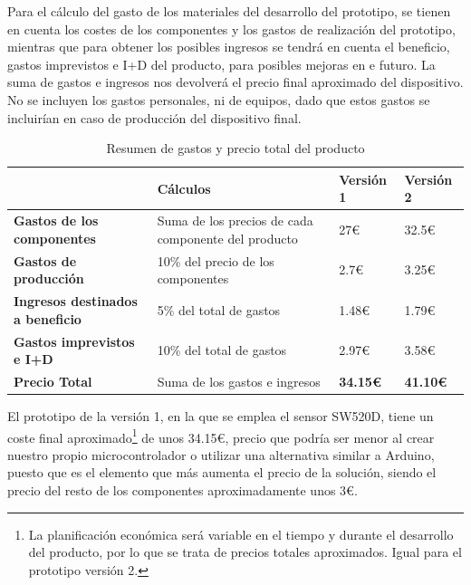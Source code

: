 Para el cálculo del gasto de los materiales del desarrollo del prototipo, se tienen en cuenta los costes de los componentes y los gastos de realización del prototipo, mientras que para obtener los posibles ingresos se tendrá en cuenta el beneficio, gastos imprevistos e I+D del producto, para posibles mejoras en e futuro. La suma de gastos e ingresos nos devolverá el precio final aproximado del dispositivo. No se incluyen los gastos personales, ni de equipos, dado que estos gastos se incluirían en caso de producción del dispositivo final.


\begin{table}[h!]
\centering
\begin{tabular}{ |m{4cm}|m{4cm}|m{2cm}|m{2cm}|  } 
\hline
\cellcolor[HTML]{B9E3F0}\textbf{} & \cellcolor[HTML]{B9E3F0}\textbf{Cálculos} & \cellcolor[HTML]{B9E3F0}\textbf{Versión 1}& \cellcolor[HTML]{B9E3F0}\textbf{Versión 2}\\

\hline
\cellcolor[HTML]{EFEFEF}\textbf{Gastos de los componentes}             & {Suma de los precios de cada componente del producto}   & 27€ & 32.5€\\
\hline
\cellcolor[HTML]{EFEFEF}\textbf{Gastos de producción}                & {10\% del precio de los componentes} & 2.7€ & 3.25€\\
\hline
\cellcolor[HTML]{EFEFEF}\textbf{Ingresos destinados a beneficio}                & {5\% del total de gastos} & 1.48€ & 1.79€\\
\hline
\cellcolor[HTML]{EFEFEF}\textbf{Gastos imprevistos e I+D} & {10\% del total de gastos} & 2.97€ & 3.58€\\
\hline
\cellcolor[HTML]{EFEFEF}\textbf{Precio Total} & {Suma de los gastos e ingresos} & \textbf{34.15€} & \textbf{41.10€}\\
\hline
\end{tabular}
\caption{Resumen de gastos y precio total del producto}
\end{table}

El prototipo de la versión 1, en la que se emplea el sensor SW520D\cite{SW520D_1}, tiene un coste final aproximado\footnote{La planificación económica será variable en el tiempo y durante el desarrollo del producto, por lo que se trata de precios totales aproximados. Igual para el prototipo versión 2.} de unos 34.15€, precio que podría ser menor al crear nuestro propio microcontrolador o utilizar una alternativa similar a Arduino, puesto que es el elemento que más aumenta el precio de la solución, siendo el precio del resto de los componentes aproximadamente unos 3€.

